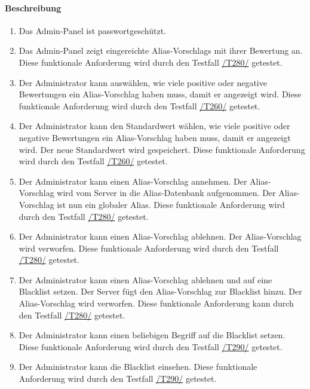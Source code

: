 \paragraph{Beschreibung}
\begin{enumerate}[start=101, label=\textbf{/FA\arabic*/}, align=left]
    \item Das \Gls{Admin-Panel} ist passwortgeschützt.
    \item \label{/FA102/} Das \Gls{Admin-Panel} zeigt eingereichte \Glspl{Alias-Vorschlag} mit ihrer Bewertung an. Diese funktionale Anforderung wird durch den Testfall \hyperref[/T280/]{/T280/} getestet.
    \item \label{/FA103/} Der \Gls{Administrator} kann auswählen, wie viele positive oder negative Bewertungen ein \Gls{Alias-Vorschlag} haben muss, damit er angezeigt wird. Diese funktionale Anforderung wird durch den Testfall \hyperref[/T260/]{/T260/} getestet.
    \item \label{/FA104/} Der \Gls{Administrator} kann den Standardwert wählen, wie viele positive oder negative Bewertungen ein \Gls{Alias-Vorschlag} haben muss, damit er angezeigt wird. Der neue Standardwert wird gespeichert. Diese funktionale Anforderung wird durch den Testfall \hyperref[/T260/]{/T260/} getestet.
    \item \label{/FA105/} Der \Gls{Administrator} kann einen \Gls{Alias-Vorschlag} annehmen. Der \Gls{Alias-Vorschlag} wird vom \Gls{Server} in die \Gls{Alias}-\Gls{Datenbank} aufgenommen. Der \Gls{Alias-Vorschlag} ist nun ein \gls{global}er \Gls{Alias}. Diese funktionale Anforderung wird durch den Testfall \hyperref[/T280/]{/T280/} getestet.
    \item \label{/FA106/} Der \Gls{Administrator} kann einen \Gls{Alias-Vorschlag} ablehnen. Der \Gls{Alias-Vorschlag} wird verworfen. Diese funktionale Anforderung wird durch den Testfall \hyperref[/T280/]{/T280/} getestet.
    \item \label{/FA107/} Der \Gls{Administrator} kann einen \Gls{Alias-Vorschlag} ablehnen und auf eine \Gls{Blacklist} setzen. Der \Gls{Server} fügt den {Alias-Vorschlag} zur \Gls{Blacklist} hinzu. Der \Gls{Alias-Vorschlag} wird verworfen. Diese funktionale Anforderung kann durch den Testfall \hyperref[/T280/]{/T280/} getestet.
    \item \label{/FA108/} Der \Gls{Administrator} kann einen beliebigen Begriff auf die \Gls{Blacklist} setzen. Diese funktionale Anforderung wird durch den Testfall \hyperref[/T290/]{/T290/} getestet.
    \item \label{/FA109/} Der \Gls{Administrator} kann die \Gls{Blacklist} einsehen. Diese funktionale Anforderung wird durch den Testfall \hyperref[/T290/]{/T290/} getestet.

\end{enumerate}
